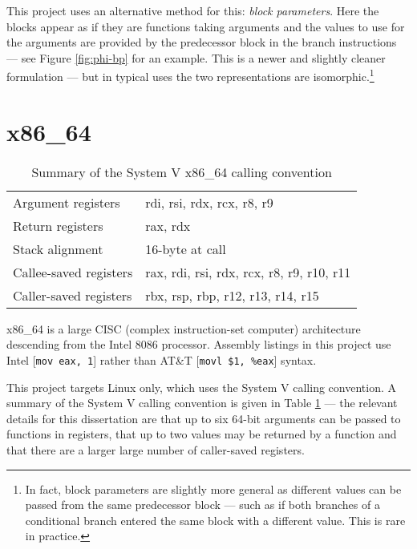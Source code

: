 This project uses an alternative method for this: \emph{block parameters}.
Here the blocks appear as if they are functions taking arguments and the values to use for the
arguments are provided by the predecessor block in the branch instructions --- see Figure
\ref{fig:phi-bp} for an example. This is a newer and slightly cleaner formulation --- but in
typical uses
the two representations are isomorphic.\footnote{In fact, block parameters are slightly more
    general as different values can be passed from the same predecessor block --- such as if both
    branches of a conditional branch entered the same block with a different value. This is rare
    in
    practice.}

\section{x86\_64}

\begin{table}[h]
    \centering

    \begin{tabular}{ll}\toprule
        Argument registers     & rdi, rsi, rdx, rcx, r8, r9                \\
        Return registers       & rax, rdx                                  \\
        Stack alignment        & 16-byte at call                           \\
        Callee-saved registers & rax, rdi, rsi, rdx, rcx, r8, r9, r10, r11 \\
        Caller-saved registers & rbx, rsp, rbp, r12, r13, r14, r15         \\
        \bottomrule
    \end{tabular}

    \caption{Summary of the System V x86\_64 calling convention}
    \label{table:systemv}

\end{table}

x86\_64 is a large CISC (complex instruction-set computer) architecture descending from the Intel
8086 processor.
Assembly listings in this project use Intel
    [\texttt{mov eax, 1}] rather than AT\&T [\texttt{movl
    \$1, \%eax}] syntax.

This project targets Linux only, which uses the System V calling convention.  A summary of the
System V calling convention is given in Table \ref{table:systemv} --- the relevant details for this
dissertation are that up to six 64-bit arguments can be passed to functions in registers, that up
to two values may be returned by a function and that there are a larger large number of
caller-saved
registers.

